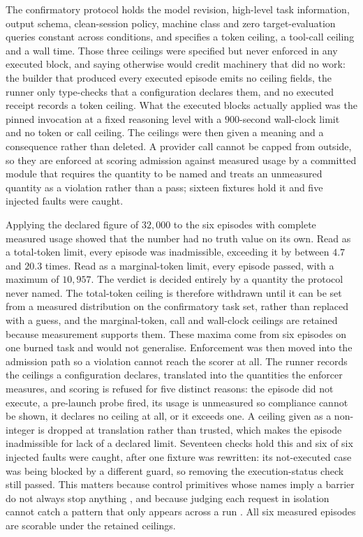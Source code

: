 \documentclass[11pt,a4paper]{article}
\begin{document}
The confirmatory protocol holds the model revision, high-level task information,
output schema, clean-session policy, machine class and zero target-evaluation queries
constant across conditions, and specifies a token ceiling, a tool-call ceiling and a wall
time. Those three ceilings were specified but never enforced in any executed block, and
saying otherwise would credit machinery that did no work: the builder that produced every
executed episode emits no ceiling fields, the runner only type-checks that a configuration
declares them, and no executed receipt records a token ceiling. What the executed blocks
actually applied was the pinned invocation at a fixed reasoning level with a $900$-second
wall-clock limit and no token or call ceiling. The ceilings were then given a meaning and a
consequence rather than deleted. A provider call cannot be capped from outside, so they
are enforced at scoring admission against measured usage by a committed module that
requires the quantity to be named and treats an unmeasured quantity as a violation rather
than a pass; sixteen fixtures hold it and five injected faults were caught.

Applying the declared figure of $32{,}000$ to the six episodes with complete measured
usage showed that the number had no truth value on its own. Read as a total-token limit,
every episode was inadmissible, exceeding it by between $4.7$ and $20.3$ times. Read as a
marginal-token limit, every episode passed, with a maximum of $10{,}957$. The verdict is
decided entirely by a quantity the protocol never named. The total-token ceiling is
therefore withdrawn until it can be set from a measured distribution on the confirmatory
task set, rather than replaced with a guess, and the marginal-token, call and wall-clock
ceilings are retained because measurement supports them. These maxima come from six
episodes on one burned task and would not generalise. Enforcement was then moved into the
admission path so a violation cannot reach the scorer at all. The runner records the
ceilings a configuration declares, translated into the quantities the enforcer measures,
and scoring is refused for five distinct reasons: the episode did not execute, a
pre-launch probe fired, its usage is unmeasured so compliance cannot be shown, it declares
no ceiling at all, or it exceeds one. A ceiling given as a non-integer is dropped at
translation rather than trusted, which makes the episode inadmissible for lack of a
declared limit. Seventeen checks hold this and six of six injected faults were caught,
after one fixture was rewritten: its not-executed case was being blocked by a different
guard, so removing the execution-status check still passed. This matters because control
primitives whose names imply a barrier do not always stop anything
\citep{controlprimitives2026}, and because judging each request in isolation cannot catch
a pattern that only appears across a run \citep{perrequestlimit2026}. All six measured
episodes are scorable under the retained ceilings.
\end{document}
